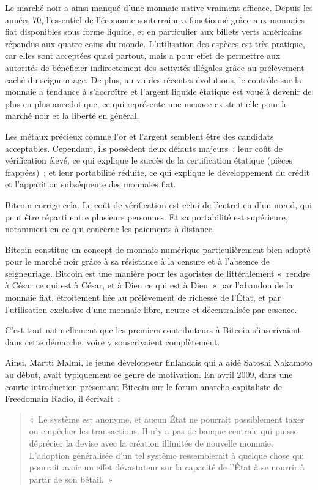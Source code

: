 Le marché noir a ainsi manqué d'une monnaie native vraiment efficace. Depuis les années 70, l'essentiel de l'économie souterraine a fonctionné grâce aux monnaies fiat disponibles sous forme liquide, et en particulier aux billets verts américains répandus aux quatre coins du monde. L'utilisation des espèces est très pratique, car elles sont acceptées quasi partout, mais a pour effet de permettre aux autorités de bénéficier indirectement des activités illégales grâce au prélèvement caché du seigneuriage. De plus, au vu des récentes évolutions, le contrôle sur la monnaie a tendance à s'accroître et l'argent liquide étatique est voué à devenir de plus en plus anecdotique, ce qui représente une menace existentielle pour le marché noir et la liberté en général.

Les métaux précieux comme l'or et l'argent semblent être des candidats acceptables. Cependant, ils possèdent deux défauts majeurs~: leur coût de vérification élevé, ce qui explique le succès de la certification étatique (pièces frappées)~; et leur portabilité réduite, ce qui explique le développement du crédit et l'apparition subséquente des monnaies fiat.

Bitcoin corrige cela. Le coût de vérification est celui de l'entretien d'un nœud, qui peut être réparti entre plusieurs personnes. Et sa portabilité est supérieure, notamment en ce qui concerne les paiements à distance.

Bitcoin constitue un concept de monnaie numérique particulièrement bien adapté pour le marché noir grâce à sa résistance à la censure et à l'absence de seigneuriage. Bitcoin est une manière pour les agoristes de littéralement «~rendre à César ce qui est à César, et à Dieu ce qui est à Dieu~» par l'abandon de la monnaie fiat, étroitement liée au prélèvement de richesse de l'État, et par l'utilisation exclusive d'une monnaie libre, neutre et décentralisée par essence.

C'est tout naturellement que les premiers contributeurs à Bitcoin s'inscrivaient dans cette démarche, voire y souscrivaient complètement.

Ainsi, Martti Malmi, le jeune développeur finlandais qui a aidé Satoshi Nakamoto au début, avait typiquement ce genre de motivation. En avril 2009, dans une courte introduction présentant Bitcoin sur le forum anarcho-capitaliste de Freedomain Radio, il écrivait~:

\begin{quote}
«~Le système est anonyme, et aucun État ne pourrait possiblement taxer ou empêcher les transactions. Il n'y a pas de banque centrale qui puisse déprécier la devise avec la création illimitée de nouvelle monnaie. L'adoption généralisée d'un tel système ressemblerait à quelque chose qui pourrait avoir un effet dévastateur sur la capacité de l'État à se nourrir à partir de son bétail.~»
\end{quote}

